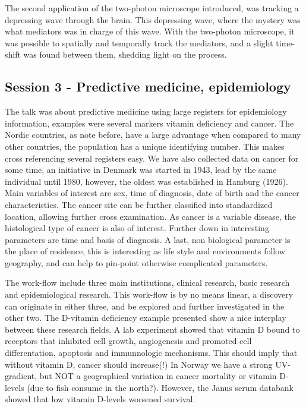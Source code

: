 \documentclass[12p]{article}
\begin{document}
The second application of the two-photon microscope introduced, was tracking a depressing wave through the brain.
This depressing wave, where the mystery was what mediators was in charge of this wave.
With the two-photon microscope, it was possible to spatially and temporally track the mediators, and a slight time-shift was found between them, shedding light on the process.

\subsection*{Session 3 - Predictive medicine, epidemiology}

The talk was about predictive medicine using large registers for epidemiology information, examples were several markers vitamin deficiency and cancer.
The Nordic countries, as note before, have a large advantage when compared to many other countries, the population has a unique identifying number.
This makes cross referencing several registers easy.
We have also collected data on cancer for some time, an initiative in Denmark was started in 1943, lead by the same individual until 1980, however, the oldest was established in Hamburg (1926).
Main variables of interest are sex, time of diagnosis, date of birth and the cancer characteristics.
The cancer site can be further classified into standardized location, allowing further cross examination.
As cancer is a variable disease, the histological type of cancer is also of interest.
Further down in interesting parameters are time and basis of diagnosis.
A last, non biological parameter is the place of residence, this is interesting as life style and environments follow geography, and can help to pin-point otherwise complicated parameters.

The work-flow include three main institutions, clinical research, basic research and epidemiological research.
This work-flow is by no means linear, a discovery can originate in either three, and be explored and further investigated in the other two.
The D-vitamin deficiency example presented show a nice interplay between these research fields.
A lab experiment showed that vitamin D bound to receptors that inhibited cell growth, angiogenesis and promoted cell differentation, apoptosis and immunnologic mechanisms.
This should imply that without vitamin D, cancer should increase(!)
In Norway we have a strong UV-gradient, but NOT a geographical variation in cancer mortality or vitamin D-levels (due to fish consume in the north?).
However, the Janus serum databank showed that low vitamin D-levels worsened survival.
\end{document}
